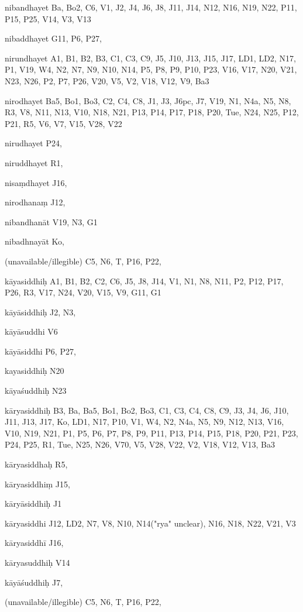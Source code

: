 \begin{ekdosis}
\begin{marma}[hp01_055]
 \begin{marma}[hp02_003]
\item[nibandhayet] Ba, Bo2, C6, V1, J2, J4, J6, J8, J11, J14, N12, N16, N19, N22, P11, P15, P25, V14, V3, V13
\item[nibaddhayet] G11, P6, P27,
\item[nirundhayet] A1, B1, B2, B3, C1, C3, C9, J5, J10, J13, J15, J17, LD1, LD2, N17, P1, V19, W4, N2, N7, N9, N10, N14, P5, P8, P9, P10, P23, V16, V17, N20, V21, N23, N26, P2, P7, P26, V20, V5, V2, V18, V12, V9, Ba3
\item[nirodhayet] Ba5, Bo1, Bo3, C2, C4, C8, J1, J3, J6pc, J7, V19, N1, N4a, N5, N8, R3, V8, N11, N13, V10, N18, N21, P13, P14, P17, P18, P20, Tue, N24, N25, P12, P21, R5, V6, V7, V15, V28, V22
\item[nirudhayet] P24,
\item[niruddhayet] R1, 
\item[nisaṃdhayet] J16,
\item[nirodhanaṃ] J12,
\item[nibandhanāt] V19, N3, G1
\item[nibadhnayāt] Ko,
\item[(unavailable/illegible)] C5, N6, T, P16, P22,
  \begin{description}

    \end{description}
 \end{marma}



 \begin{marma}[hp02_004]
\item[kāyasiddhiḥ] A1, B1, B2, C2, C6, J5, J8, J14, V1, N1, N8, N11, P2, P12, P17, P26, R3, V17, N24, V20, V15, V9, G11, G1
\item[kāyāsiddhiḥ] J2, N3,
\item[kāyāsuddhi] V6
\item[kāyāsiddhi] P6, P27, 
\item[kayasiddhiḥ] N20
\item[kāyaśuddhiḥ] N23
\item[kāryasiddhiḥ] B3, Ba, Ba5, Bo1, Bo2, Bo3, C1, C3, C4, C8, C9, J3, J4, J6, J10, J11, J13, J17, Ko, LD1, N17, P10, V1, W4, N2, N4a, N5, N9, N12, N13, V16, V10, N19, N21, P1, P5, P6, P7, P8, P9, P11, P13, P14, P15, P18, P20, P21, P23, P24, P25, R1, Tue, N25, N26, V70, V5, V28, V22, V2, V18, V12, V13, Ba3
\item[kāryasiddhaḥ] R5,
\item[kāryasiddhiṃ] J15, 
\item[kāryāsiddhiḥ] J1
\item[kāryasiddhi] J12, LD2, N7, V8, N10, N14("rya" unclear), N16, N18, N22, V21, V3 
\item[kāryasiddhī] J16,
\item[kāryasuddhiḥ] V14
\item[kāyāśuddhiḥ] J7,
\item[(unavailable/illegible)] C5, N6, T, P16, P22,


\end{marma}
\end{marma}
\end{ekdosis}
